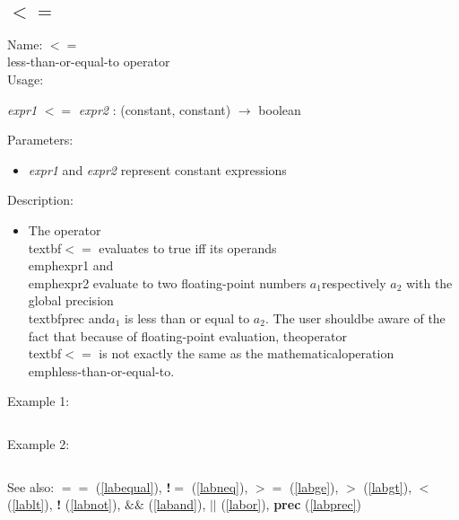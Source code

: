\subsection{$<=$}
\label{lable}
\noindent Name: \textbf{$<=$}\\
less-than-or-equal-to operator\\
\noindent Usage: 
\begin{center}
\emph{expr1} \textbf{$<=$} \emph{expr2} : (\textsf{constant}, \textsf{constant}) $\rightarrow$ \textsf{boolean}\\
\end{center}
Parameters: 
\begin{itemize}
\item \emph{expr1} and \emph{expr2} represent constant expressions
\end{itemize}
\noindent Description: \begin{itemize}

\item The operator \\textbf{$<=$} evaluates to true iff its operands \\emph{expr1} and\n   \\emph{expr2} evaluate to two floating-point numbers $a_1$\n   respectively $a_2$ with the global precision \\textbf{prec} and\n   $a_1$ is less than or equal to $a_2$. The user should\n   be aware of the fact that because of floating-point evaluation, the\n   operator \\textbf{$<=$} is not exactly the same as the mathematical\n   operation \\emph{less-than-or-equal-to}.\n\end{itemize}
\noindent Example 1: 
\begin{center}\begin{minipage}{15cm}\begin{Verbatim}[frame=single]
\end{Verbatim}
\end{minipage}\end{center}
\noindent Example 2: 
\begin{center}\begin{minipage}{15cm}\begin{Verbatim}[frame=single]
\end{Verbatim}
\end{minipage}\end{center}
See also: \textbf{$==$} (\ref{labequal}), \textbf{!$=$} (\ref{labneq}), \textbf{$>=$} (\ref{labge}), \textbf{$>$} (\ref{labgt}), \textbf{$<$} (\ref{lablt}), \textbf{!} (\ref{labnot}), \textbf{$\&\&$} (\ref{laband}), \textbf{$||$} (\ref{labor}), \textbf{prec} (\ref{labprec})
